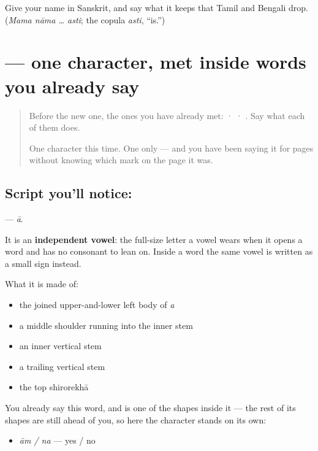 \begin{tcolorbox}[breakable,colback=teal!4,colframe=teal!35!black,title={Before you move on}]
Give your name in Sanskrit, and say what it keeps that Tamil and Bengali drop. (\emph{Mama nāma … asti}; the copula \emph{asti}, \textquotedblleft{}is.\textquotedblright{})
\end{tcolorbox}
\section[\texorpdfstring{\sk{आ} (ā)}{आ (ā)}]{ — one character, met inside words you already say}

\label{lesson:SA-S04-letter-aa}



\begin{quote}
Before the new one, the ones you have already met:  ·  · . Say what each of them does.

One character this time. One only — and you have been saying it for pages without knowing which mark on the page it was.
\end{quote}

\subsection*{Script you'll notice: }
\textbf{} — \emph{ā}.

It is an \textbf{independent vowel}: the full-size letter a vowel wears when it opens a word and has no consonant to lean on. Inside a word the same vowel is written as a small sign instead.

What it is made of:

\begin{itemize}
\raggedright
  \item the joined upper-and-lower left body of \emph{a}
  \item a middle shoulder running into the inner stem
  \item an inner vertical stem
  \item a trailing vertical stem
  \item the top shirorekhā
\end{itemize}

You already say this word, and  is one of the shapes inside it — the rest of its shapes are still ahead of you, so here the character stands on its own:

\begin{itemize}
\raggedright
  \item \emph{ām / na} — yes / no
\end{itemize}

